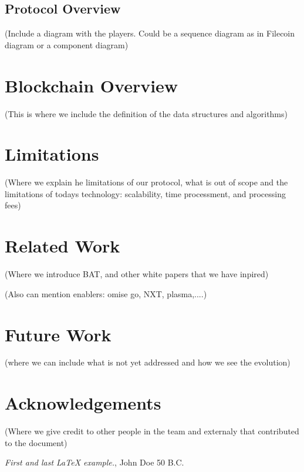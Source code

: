 \documentclass[12pt, a4paper, twoside, titlepage]{article}
\begin{document}
\subsection{Protocol Overview}

(Include a diagram with the players. Could be a sequence diagram as in Filecoin diagram or a component diagram)

\section{Blockchain Overview}

(This is where we include the definition of the data structures and algorithms)


\section{Limitations}

(Where we explain he limitations of our protocol, what is out of scope and the limitations of todays technology: scalability, time processment, and processing fees)

\section{Related Work}

(Where we introduce BAT, and other white papers that we have inpired)

(Also can mention enablers: omise go, NXT, plasma,....)

\section{Future Work}

(where we can include what is not yet addressed and how we see the evolution)

\section{Acknowledgements}

(Where we give credit to other people in the team and externaly that contributed to the document)

\begin{thebibliography}{9}
 \emph{First and last \LaTeX{} example.},
John Doe 50 B.C. 
\end{thebibliography}
\end{document}
